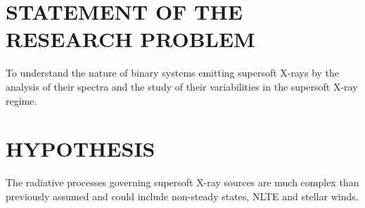     \section{\MakeUppercase{Statement of the Research Problem}} \label{introduction:problem_statement}
    	To understand the nature of binary systems emitting supersoft X-rays by the analysis of their spectra and the study of their variabilities in the supersoft X-ray regime.
        
    \section{\MakeUppercase{Hypothesis}} \label{introduction:hypothesis}
    	The radiative processes governing supersoft X-ray sources are much complex than previously assumed and could include non-steady states, NLTE and stellar winds.
    

